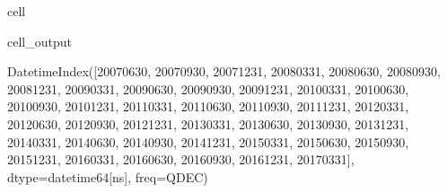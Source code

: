\documentclass[letterpaper,10pt,english]{jupyterBook}
\begin{document}
\begin{sphinxuseclass}{cell}
\begin{sphinxVerbatimOutput}
\begin{sphinxuseclass}{cell_output}
\begin{sphinxVerbatim}[commandchars=\\\{\}]
DatetimeIndex([\PYGZsq{}2007\PYGZhy{}06\PYGZhy{}30\PYGZsq{}, \PYGZsq{}2007\PYGZhy{}09\PYGZhy{}30\PYGZsq{}, \PYGZsq{}2007\PYGZhy{}12\PYGZhy{}31\PYGZsq{}, \PYGZsq{}2008\PYGZhy{}03\PYGZhy{}31\PYGZsq{},
               \PYGZsq{}2008\PYGZhy{}06\PYGZhy{}30\PYGZsq{}, \PYGZsq{}2008\PYGZhy{}09\PYGZhy{}30\PYGZsq{}, \PYGZsq{}2008\PYGZhy{}12\PYGZhy{}31\PYGZsq{}, \PYGZsq{}2009\PYGZhy{}03\PYGZhy{}31\PYGZsq{},
               \PYGZsq{}2009\PYGZhy{}06\PYGZhy{}30\PYGZsq{}, \PYGZsq{}2009\PYGZhy{}09\PYGZhy{}30\PYGZsq{}, \PYGZsq{}2009\PYGZhy{}12\PYGZhy{}31\PYGZsq{}, \PYGZsq{}2010\PYGZhy{}03\PYGZhy{}31\PYGZsq{},
               \PYGZsq{}2010\PYGZhy{}06\PYGZhy{}30\PYGZsq{}, \PYGZsq{}2010\PYGZhy{}09\PYGZhy{}30\PYGZsq{}, \PYGZsq{}2010\PYGZhy{}12\PYGZhy{}31\PYGZsq{}, \PYGZsq{}2011\PYGZhy{}03\PYGZhy{}31\PYGZsq{},
               \PYGZsq{}2011\PYGZhy{}06\PYGZhy{}30\PYGZsq{}, \PYGZsq{}2011\PYGZhy{}09\PYGZhy{}30\PYGZsq{}, \PYGZsq{}2011\PYGZhy{}12\PYGZhy{}31\PYGZsq{}, \PYGZsq{}2012\PYGZhy{}03\PYGZhy{}31\PYGZsq{},
               \PYGZsq{}2012\PYGZhy{}06\PYGZhy{}30\PYGZsq{}, \PYGZsq{}2012\PYGZhy{}09\PYGZhy{}30\PYGZsq{}, \PYGZsq{}2012\PYGZhy{}12\PYGZhy{}31\PYGZsq{}, \PYGZsq{}2013\PYGZhy{}03\PYGZhy{}31\PYGZsq{},
               \PYGZsq{}2013\PYGZhy{}06\PYGZhy{}30\PYGZsq{}, \PYGZsq{}2013\PYGZhy{}09\PYGZhy{}30\PYGZsq{}, \PYGZsq{}2013\PYGZhy{}12\PYGZhy{}31\PYGZsq{}, \PYGZsq{}2014\PYGZhy{}03\PYGZhy{}31\PYGZsq{},
               \PYGZsq{}2014\PYGZhy{}06\PYGZhy{}30\PYGZsq{}, \PYGZsq{}2014\PYGZhy{}09\PYGZhy{}30\PYGZsq{}, \PYGZsq{}2014\PYGZhy{}12\PYGZhy{}31\PYGZsq{}, \PYGZsq{}2015\PYGZhy{}03\PYGZhy{}31\PYGZsq{},
               \PYGZsq{}2015\PYGZhy{}06\PYGZhy{}30\PYGZsq{}, \PYGZsq{}2015\PYGZhy{}09\PYGZhy{}30\PYGZsq{}, \PYGZsq{}2015\PYGZhy{}12\PYGZhy{}31\PYGZsq{}, \PYGZsq{}2016\PYGZhy{}03\PYGZhy{}31\PYGZsq{},
               \PYGZsq{}2016\PYGZhy{}06\PYGZhy{}30\PYGZsq{}, \PYGZsq{}2016\PYGZhy{}09\PYGZhy{}30\PYGZsq{}, \PYGZsq{}2016\PYGZhy{}12\PYGZhy{}31\PYGZsq{}, \PYGZsq{}2017\PYGZhy{}03\PYGZhy{}31\PYGZsq{}],
              dtype=\PYGZsq{}datetime64[ns]\PYGZsq{}, freq=\PYGZsq{}Q\PYGZhy{}DEC\PYGZsq{})
\end{sphinxVerbatim}

\end{sphinxuseclass}\end{sphinxVerbatimOutput}

\end{sphinxuseclass}
\end{document}
